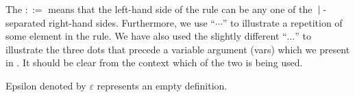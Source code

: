 The $\mathbf{::=}$ means that the left-hand side of the rule can be any one of
the $\: | \:$-separated right-hand sides. Furthermore, we use ``$\cdots$'' to
illustrate a repetition of some element in the rule. We have also used the
slightly different ``$\dots$'' to illustrate the three dots that precede a
variable argument (vars) which we present in .
It should be clear from the context which of the two is being used.

Epsilon denoted by $\varepsilon$ represents an empty definition.
